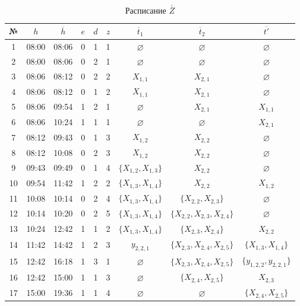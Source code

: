 \begin{table}[htbp]
\centering
\renewcommand{\arraystretch}{1.1}
\setlength{\tabcolsep}{3pt}
\begin{tabular}{|c|c|c|c|c|c|c|c|c|}
\hline
№ & $h$ & $\overline{h}$ & $e$ & $d$ & $z$ & $\overline{t}_1$ & $\overline{t}_2$ & $\overline{t'}$ \\
\hline
1 & 08:00 & 08:06 & 0 & 1 & 1 & $\varnothing$ & $\varnothing$ & $\varnothing$ \\
2 & 08:00 & 08:06 & 0 & 2 & 1 & $\varnothing$ & $\varnothing$ & $\varnothing$ \\
3 & 08:06 & 08:12 & 0 & 2 & 2 & $X_{1,1}$ & $X_{2,1}$ & $\varnothing$ \\
4 & 08:06 & 08:12 & 0 & 1 & 2 & $X_{1,1}$ & $X_{2,1}$ & $\varnothing$ \\
5 & 08:06 & 09:54 & 1 & 2 & 1 & $\varnothing$ & $X_{2,1}$ & $X_{1,1}$ \\
6 & 08:06 & 10:24 & 1 & 1 & 1 & $\varnothing$ & $\varnothing$ & $X_{2,1}$ \\
7 & 08:12 & 09:43 & 0 & 1 & 3 & $X_{1,2}$ & $X_{2,2}$ & $\varnothing$ \\
8 & 08:12 & 10:08 & 0 & 2 & 3 & $X_{1,2}$ & $X_{2,2}$ & $\varnothing$ \\
9 & 09:43 & 09:49 & 0 & 1 & 4 & $\{X_{1,2}, X_{1, 3}\}$ & $X_{2,2}$ & $\varnothing$ \\
10 & 09:54 & 11:42 & 1 & 2 & 2 & $\{X_{1,3}, X_{1,4}\}$ & $X_{2,2}$ & $X_{1,2}$ \\
11 & 10:08 & 10:14 & 0 & 2 & 4 & $\{X_{1,3}, X_{1,4}\}$ & $\{X_{2,2},X_{2,3}\}$ & $\varnothing$ \\
12 & 10:14 & 10:20 & 0 & 2 & 5 & $\{X_{1,3}, X_{1,4}\}$ & $\{X_{2,2},X_{2,3},X_{2,4}\}$ & $\varnothing$ \\
13 & 10:24 & 12:42 & 1 & 1 & 2 & $\{X_{1,3}, X_{1,4}\}$ & $\{X_{2,3},X_{2,4}\}$ &  $X_{2,2}$ \\
14 & 11:42 & 14:42 & 1 & 2 & 3 & $y_{2,2,1}$ & $\{X_{2,3},X_{2,4},X_{2,5}\}$ & $\{X_{1,3},X_{1,4}\}$ \\
15 & 12:42 & 16:18 & 1 & 3 & 1 & $\varnothing$ & $\{X_{2,3},X_{2,4},X_{2,5}\}$ & $\{y_{1,2,2},y_{2,2,1}\}$ \\
16 & 12:42 & 15:00 & 1 & 1 & 3 & $\varnothing$ & $\{X_{2,4},X_{2,5}\}$ & $X_{2,3}$ \\
17 & 15:00 & 19:36 & 1 & 1 & 4 & $\varnothing$ & $\varnothing$ & $\{X_{2,4},X_{2,5}\}$ \\
\hline
\end{tabular}
\caption{Расписание $\overline{\overline{Z}}$}
\label{tab:event_queue}
\end{table}



